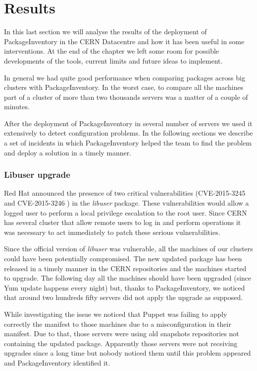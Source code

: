 \section{Results}

In this last section we will analyse the results of the deployment of
PackageInventory in the CERN Datacentre and how it has been useful in some
interventions. At the end of the chapter we left some room for possible
developments of the tools, current limits and future ideas to implement.

In general we had quite good performance when comparing packages across
big clusters with PackageInventory. In the worst case, to compare all the
machines part of a cluster of more than two thousands servers was a matter of
a couple of minutes.

After the deployment of PackageInventory in several number of servers we
used it extensively to detect configuration problems. In the following
sections we describe a set of incidents in which PackageInventory helped
the team to find the problem and deploy a solution in a timely manner.

\subsubsection{Libuser upgrade}

Red Hat announced the presence of two critical vulnerabilities
(CVE-2015-3245 \cite{cve-2015-3245} and CVE-2015-3246
\cite{cve-2015-3246}) in the \textit{libuser} package. These
vulnerabilities would allow a logged user to perform a local privilege
escalation to the root user. Since CERN has several cluster that allow
remote users to log in and perform operations it was necessary to act
immediately to patch these serious vulnerabilities.

Since the official version of \textit{libuser} was vulnerable, all the
machines of our clusters could have been potentially compromised. The
new updated package has been released in a timely manner in the CERN
repositories and the machines started to upgrade. The following day all
the machines should have been upgraded (since Yum update happens every
night) but, thanks to PackageInventory, we noticed that around two
hundreds fifty servers did not apply the upgrade as supposed.

While investigating the issue we noticed that Puppet was failing to
apply correctly the manifest to those machines due to a misconfiguration
in their manifest. Due to that, those servers were using old snapshots
repositories not containing the updated package. Apparently those
servers were not receiving upgrades since a long time but nobody noticed them
until this problem appeared and PackageInventory identified it.

